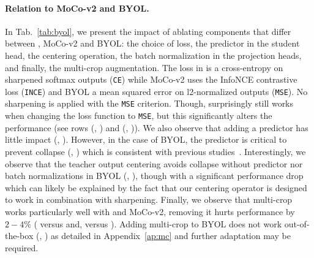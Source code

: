 \paragraph{Relation to MoCo-v2 and BYOL.}
In Tab.~\ref{tab:byol}, we present the impact of ablating components that differ between \OURS, MoCo-v2 and BYOL: the choice of loss, the predictor in the student head, the centering operation, the batch normalization in the projection heads, and finally, the multi-crop augmentation.
The loss in \OURS is a cross-entropy on sharpened softmax outputs (\texttt{CE}) while MoCo-v2 uses the InfoNCE contrastive loss (\texttt{INCE}) and BYOL a mean squared error on l2-normalized outputs (\texttt{MSE}).
No sharpening is applied with the \texttt{MSE} criterion.
Though, \OURS surprisingly still works when changing the loss function to \texttt{MSE}, but this significantly alters the performance (see rows (, ) and (, )).
We also observe that adding a predictor has little impact (, ).
However, in the case of BYOL, the predictor is critical to prevent collapse (, ) which is consistent with previous studies~\cite{chen2020exploring,grill2020bootstrap}.
Interestingly, we observe that the teacher output centering avoids collapse without predictor nor batch normalizations in BYOL (, ), though with a significant performance drop which can likely be explained by the fact that our centering operator is designed to work in combination with sharpening.
Finally, we observe that multi-crop works particularly well with \OURS and MoCo-v2, removing it hurts performance by $2-4\%$ ( versus  and,  versus ).
Adding multi-crop to BYOL does not work out-of-the-box (, ) as detailed in Appendix~\ref{ap:mc} and further adaptation may be required.

